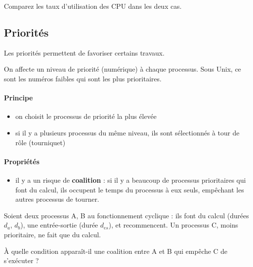 \begin{multicols}{2}
\begin{exercice}
Comparez les taux d'utilisation des CPU dans les deux cas.
\end{exercice}

\subsection{Priorités}

Les priorités permettent de favoriser certains travaux.

On affecte un niveau de priorité (numérique) à chaque processus. Sous
Unix, ce sont les numéros faibles qui sont les plus prioritaires.

\paragraph{Principe}

\begin{itemize}
\item on choisit le processus de priorité la plus élevée
\item si il y a plusieurs processus du même niveau, ils sont sélectionnés à tour de rôle (tourniquet)
\end{itemize}

\paragraph{Propriétés}
\begin{itemize}
\item il y a un risque de \textbf{coalition} : si il y a beaucoup de processus
prioritaires qui font du calcul, ils occupent le temps du processus à eux seuls,
empêchant les autres processus de tourner.
\end{itemize}

\begin{exercice}
Soient deux processus A, B au fonctionnement cyclique : ils font
 du calcul (durées $d_a$, $d_b$), une entrée-sortie (durée $d_{es}$),
 et recommencent.
Un processus C, moins prioritaire, ne fait que du calcul.

À quelle condition apparaît-il une coalition entre A et B qui empêche C de s'exécuter ?
\end{exercice}


\end{multicols}
